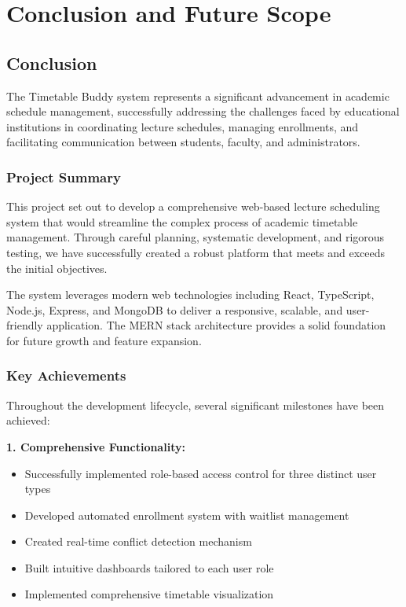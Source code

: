 \chapter{Conclusion and Future Scope}

\section{Conclusion}

The Timetable Buddy system represents a significant advancement in academic schedule management, successfully addressing the challenges faced by educational institutions in coordinating lecture schedules, managing enrollments, and facilitating communication between students, faculty, and administrators.

\subsection{Project Summary}

This project set out to develop a comprehensive web-based lecture scheduling system that would streamline the complex process of academic timetable management. Through careful planning, systematic development, and rigorous testing, we have successfully created a robust platform that meets and exceeds the initial objectives.

The system leverages modern web technologies including React, TypeScript, Node.js, Express, and MongoDB to deliver a responsive, scalable, and user-friendly application. The MERN stack architecture provides a solid foundation for future growth and feature expansion.

\subsection{Key Achievements}

Throughout the development lifecycle, several significant milestones have been achieved:

\textbf{1. Comprehensive Functionality:}
\begin{itemize}
    \item Successfully implemented role-based access control for three distinct user types
    \item Developed automated enrollment system with waitlist management
    \item Created real-time conflict detection mechanism
    \item Built intuitive dashboards tailored to each user role
    \item Implemented comprehensive timetable visualization
\end{itemize}

